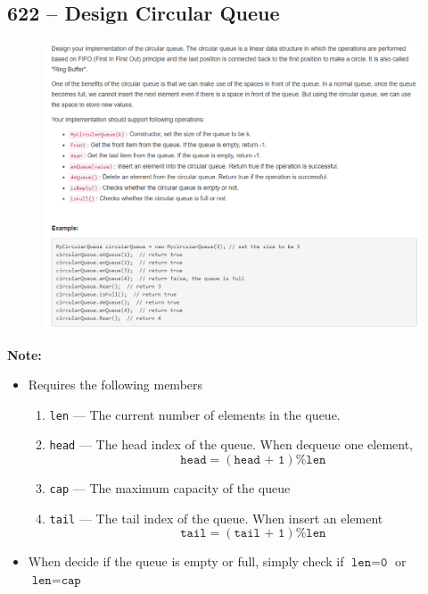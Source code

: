 \documentclass[a4paper,12pt]{article}
\begin{document}
\subsection{622 -- Design Circular Queue}
\begin{figure}[H]
	\begin{center}
		\includegraphics[width=18cm]{622.png}
	\end{center}
\end{figure}
\textbf{\large{Note:}}
\par
\vspace{0.5em}
\begin{itemize}
	\item Requires the following members
	\begin{enumerate}
		\item \texttt{len} --- The current number of elements in the queue.
		\item \texttt{head} --- The head index of the queue. When dequeue one element, 
		$$
		\texttt{head} = (\texttt{head + 1}) \% \texttt{len}
		$$
		\item \texttt{cap} --- The maximum capacity of the queue
		\item \texttt{tail} --- The tail index of the queue. When insert an element
		$$
			\texttt{tail} = (\texttt{tail + 1}) \% \texttt{len}
		$$
	 \end{enumerate}
 \item When decide if the queue is empty or full, simply check if $\texttt{len} = \texttt{0}$ or $\texttt{len} = \texttt{cap}$
\end{itemize}
\end{document}
